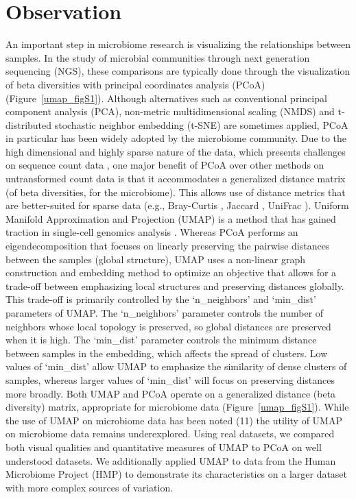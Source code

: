 \section{Observation}
An important step in microbiome research is visualizing the relationships between samples. In the study of microbial communities through next generation sequencing (NGS), these comparisons are typically done through the visualization of beta diversities with principal coordinates analysis (PCoA) \cite{Kruskal1978-xx} (Figure~\ref{umap_figS1}). Although alternatives such as conventional principal component analysis (PCA), non-metric multidimensional scaling  (NMDS) \cite{Kruskal1964-dn} and t-distributed stochastic neighbor embedding (t-SNE) \cite{Van_der_Maaten2008-af} are sometimes applied, PCoA in particular has been widely adopted by the microbiome community.  Due to the high dimensional and highly sparse nature of the data, which presents challenges on sequence count data \cite{Aitchison1983-mz,Martino2019-op}, one major benefit of PCoA over other methods on untransformed count data is that it accommodates a generalized distance matrix (of beta diversities, for the microbiome).  This allows use of distance metrics that are better-suited for sparse data (e.g., Bray-Curtis \cite{Bray1957-fg}, Jaccard \cite{Jaccard1912-bk}, UniFrac \cite{Lozupone2005-aj}).
Uniform Manifold Approximation and Projection (UMAP) \cite{McInnes2018-zd}  is a method that has gained traction in single-cell genomics analysis \cite{Hao2020-gu}. Whereas PCoA performs an eigendecomposition that focuses on linearly preserving the pairwise distances between the samples (global structure), UMAP uses a non-linear graph construction and embedding method to optimize an objective that allows for a trade-off between emphasizing local structures and preserving distances globally. This trade-off is primarily controlled by the `n\_neighbors' and `min\_dist' parameters of UMAP. The `n\_neighbors' parameter controls the number of neighbors whose local topology is preserved, so global distances are preserved when it is high. The `min\_dist' parameter controls the minimum distance between samples in the embedding, which affects the spread of clusters. Low values of `min\_dist' allow UMAP to emphasize the similarity of dense clusters of samples, whereas larger values of `min\_dist' will focus on preserving distances more broadly.
Both UMAP and PCoA operate on a generalized distance (beta diversity) matrix, appropriate for microbiome data (Figure~\ref{umap_figS1}). While the use of UMAP on microbiome data has been noted (11) the utility of UMAP on microbiome data remains underexplored. Using real datasets, we compared both visual qualities and quantitative measures of UMAP to PCoA on well understood datasets. We additionally applied UMAP to data from the Human Microbiome Project (HMP) \cite{The_Human_Microbiome_Project_Consortium2012-og} to demonstrate its characteristics on a larger dataset with more complex sources of variation.
